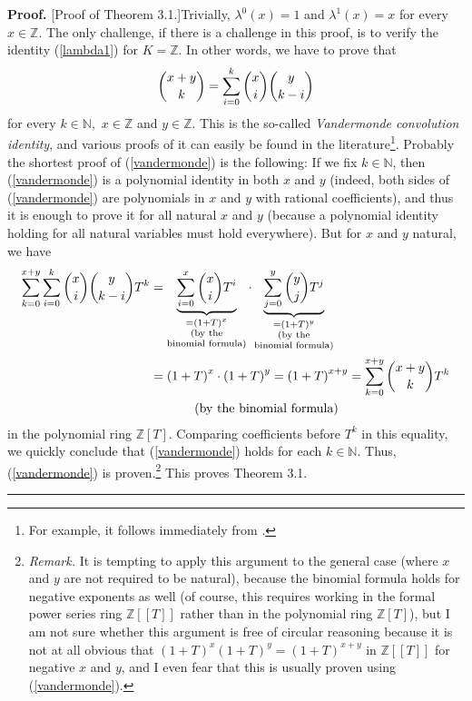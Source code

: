 \documentclass[numbers=enddot,12pt,final,onecolumn,notitlepage]{scrartcl}%
\newenvironment{proof}[1][Proof]{\noindent\textbf{#1.} }{\ \rule{0.5em}{0.5em}}
\begin{document}
\begin{proof}
[Proof of Theorem 3.1.]Trivially, $\lambda^{0}\left(  x\right)  =1$ and
$\lambda^{1}\left(  x\right)  =x$ for every $x\in\mathbb{Z}$. The only
challenge, if there is a challenge in this proof, is to verify the identity
(\ref{lambda1}) for $K=\mathbb{Z}$. In other words, we have to prove that%
\begin{equation}
\dbinom{x+y}{k}=\sum_{i=0}^{k}\dbinom{x}{i}\dbinom{y}{k-i} \label{vandermonde}%
\end{equation}
for every $k\in\mathbb{N},$ $x\in\mathbb{Z}$ and $y\in\mathbb{Z}.$ This is the
so-called \textit{Vandermonde convolution identity}, and various proofs of it
can easily be found in the literature\footnote{For example, it follows
immediately from \cite[Theorem 2.24]{Grin-detn}.}. Probably the shortest proof
of (\ref{vandermonde}) is the following: If we fix $k\in\mathbb{N}$, then
(\ref{vandermonde}) is a polynomial identity in both $x$ and $y$ (indeed, both
sides of (\ref{vandermonde}) are polynomials in $x$ and $y$ with rational
coefficients), and thus it is enough to prove it for all natural $x$ and $y$
(because a polynomial identity holding for all natural variables must hold
everywhere). But for $x$ and $y$ natural, we have%
\begin{align*}
\sum_{k=0}^{x+y}\sum_{i=0}^{k}\dbinom{x}{i}\dbinom{y}{k-i}T^{k}  &
=\underbrace{\sum_{i=0}^{x}\dbinom{x}{i}T^{i}}_{\substack{=\left(  1+T\right)
^{x}\\\text{(by the}\\\text{binomial formula)}}}\cdot\underbrace{\sum
_{j=0}^{y}\dbinom{y}{j}T^{j}}_{\substack{=\left(  1+T\right)  ^{y}\\\text{(by
the}\\\text{binomial formula)}}}\\
&  =\left(  1+T\right)  ^{x}\cdot\left(  1+T\right)  ^{y}=\left(  1+T\right)
^{x+y}=\sum_{k=0}^{x+y}\dbinom{x+y}{k}T^{k}\\
&  \ \ \ \ \ \ \ \ \ \ \left(  \text{by the binomial formula}\right)
\end{align*}
in the polynomial ring $\mathbb{Z}\left[  T\right]  $. Comparing coefficients
before $T^{k}$ in this equality, we quickly conclude that (\ref{vandermonde})
holds for each $k\in\mathbb{N}$. Thus, (\ref{vandermonde}) is
proven.\footnote{\textit{Remark.} It is tempting to apply this argument to the
general case (where $x$ and $y$ are not required to be natural), because the
binomial formula holds for negative exponents as well (of course, this
requires working in the formal power series ring $\mathbb{Z}\left[  \left[
T\right]  \right]  $ rather than in the polynomial ring $\mathbb{Z}\left[
T\right]  $), but I am not sure whether this argument is free of circular
reasoning because it is not at all obvious that $\left(  1+T\right)
^{x}\left(  1+T\right)  ^{y}=\left(  1+T\right)  ^{x+y}$ in $\mathbb{Z}\left[
\left[  T\right]  \right]  $ for negative $x$ and $y$, and I even fear that
this is usually proven using (\ref{vandermonde}).} This proves Theorem 3.1.
\end{proof}
\end{document}
